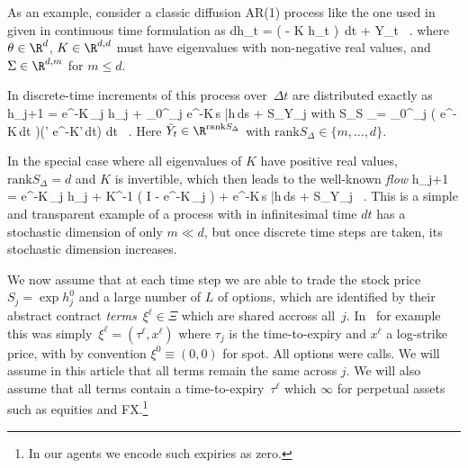 \documentclass{hbarticle}
\begin{document}
   	\begin{example}[AR(1)]
    As an example, consider a classic
    diffusion AR(1) process like the one used in~\cite{DYSANOS}
    given in continuous time formulation as
    \eqx
	    	dh_t = ( \theta - K h_t )\, dt + \Sigma Y_t  \ .  
    \eqend
    where $\theta\in \R^d$, $K\in \R^{d,d}$ must have eigenvalues
    with non-negative 
    real values, and $\Sigma \in \R^{d,m}$ for $m\leq d$.
    
    In discrete-time increments of this process over~$\Delta t$ 
    are distributed exactly as
    \eqx
    	h_{j+1} = e^{-K\,\Delta_j} h_j + \int_0^{\Delta_j} 
    	e^{-K\,s} \bar h\,ds
    		+
    			S_\Delta \tilde Y_j  
    \eqend
    with
    \eqx		
  	   S_\Delta S _\Delta  = \int_0^{\Delta _j} ( e^{-K\,dt} \Sigma )(\Sigma' e^{-K'\,dt}) dt \ .
    \eqend
    Here $\tilde Y_t\in \R^{\mathrm{rank} S_\Delta}$
    with $\mathrm{rank} S_\Delta \in \{m,\ldots,d\}$.
    
    In the special case where all eigenvalues of $K$
    have positive real values, $\mathrm{rank} S_\Delta=d$
    and $K$ is invertible, which then leads to the 
    well-known \emph{flow} 
    \eqx
    	h_{j+1} = e^{-K\,\Delta_j} h_j + K^{-1}
    	\big( I - e^{-K\,\Delta_j} \big) \theta 
    	+
    	e^{-K\,s} \bar h\,ds
    		+
    			S_\Delta \tilde Y_j \ .
    \eqend
    This is a simple and transparent example of a process with in infinitesimal time
    $dt$ has a stochastic dimension of only $m\ll d$, but once discrete time steps
    are taken, its stochastic dimension increases.
    \end{example}
    
    We now assume that at each time step we are able to trade
    the stock price $S_j=\exp h^0_j$ and a large number of $L$ 
    of options, which are identified by their abstract
    contract \emph{terms}~$\xi^\ell\in \Xi$ which are shared accross all~$j$.  In~\cite{DYSANOS} for example
    this was simply~$\xi^\ell = (\tau^\ell, x^\ell)$
    where $\tau_j$ is the time-to-expiry and $x^\ell$ a log-strike price,
    with by convention $\xi^0 \equiv (0,0)$ for spot.
    All options were calls.
    We will assume in this article that all terms remain the same across $j$.
    We will also assume that all terms contain a time-to-expiry~$\tau^\ell$
    which $\infty$ for perpetual assets such as equities and FX.\footnote{
        In our agents we encode such expiries as zero.
    }
    
\end{document}
